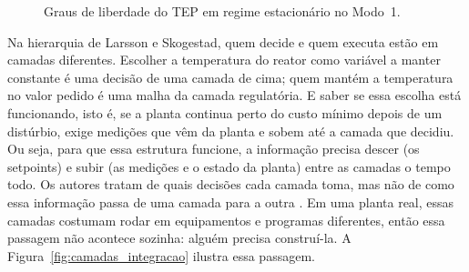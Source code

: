 \begin{figure}[htbp]
\centering
{}
\caption{Graus de liberdade do TEP em regime estacionário no Modo~1.}
\label{fig:graus_liberdade_tep}
\end{figure}

Na hierarquia de Larsson e Skogestad, quem decide e quem executa estão em camadas diferentes. Escolher a temperatura do reator como variável a manter constante é uma decisão de uma camada de cima; quem mantém a temperatura no valor pedido é uma malha da camada regulatória. E saber se essa escolha está funcionando, isto é, se a planta continua perto do custo mínimo depois de um distúrbio, exige medições que vêm da planta e sobem até a camada que decidiu. Ou seja, para que essa estrutura funcione, a informação precisa descer (os setpoints) e subir (as medições e o estado da planta) entre as camadas o tempo todo. Os autores tratam de quais decisões cada camada toma, mas não de como essa informação passa de uma camada para a outra \cite{Larsson2000, Skogestad2004}. Em uma planta real, essas camadas costumam rodar em equipamentos e programas diferentes, então essa passagem não acontece sozinha: alguém precisa construí-la. A Figura~\ref{fig:camadas_integracao} ilustra essa passagem.

